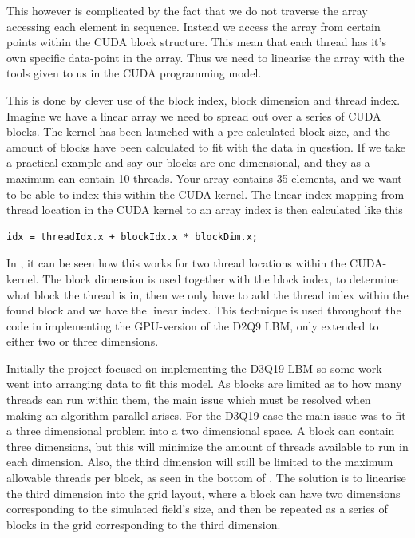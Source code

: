 
This however is complicated by the fact that we do not traverse the array accessing each element in sequence. Instead we access the array from certain points within the CUDA block structure. This mean that each thread has it's own specific data-point in the array. Thus we need to linearise the array with the tools given to us in the CUDA programming model.

This is done by clever use of the block index, block dimension and thread index. Imagine we have a linear array we need to spread out over a series of CUDA blocks. The kernel has been launched with a pre-calculated block size, and the amount of blocks have been calculated to fit with the data in question. If we take a practical example and say our blocks are one-dimensional, and they as a maximum can contain 10 threads. Your array contains 35 elements, and we want to be able to index this within the CUDA-kernel. The linear index mapping from thread location in the CUDA kernel to an array index is then calculated like this

\begin{verbatim}
idx = threadIdx.x + blockIdx.x * blockDim.x;
\end{verbatim}

In , it can be seen how this works for two thread locations within the CUDA-kernel. The block dimension is used together with the block index, to determine what block the thread is in, then we only have to add the thread index within the found block and we have the linear index. This technique is used throughout the code in implementing the GPU-version of the D2Q9 LBM, only extended to either two or three dimensions.


Initially the project focused on implementing the D3Q19 LBM so some work went into arranging data to fit this model. As blocks are limited as to how many threads can run within them, the main issue which must be resolved when making an algorithm parallel arises. For the D3Q19 case the main issue was to fit a three dimensional problem into a two dimensional space. A block can contain three dimensions, but this will minimize the amount of threads available to run in each dimension. Also, the third dimension will still be limited to the maximum allowable threads per block, as seen in the bottom of . The solution is to linearise the third dimension into the grid layout, where a block can have two dimensions corresponding to the simulated field's size, and then be repeated as a series of blocks in the grid corresponding to the third dimension.

